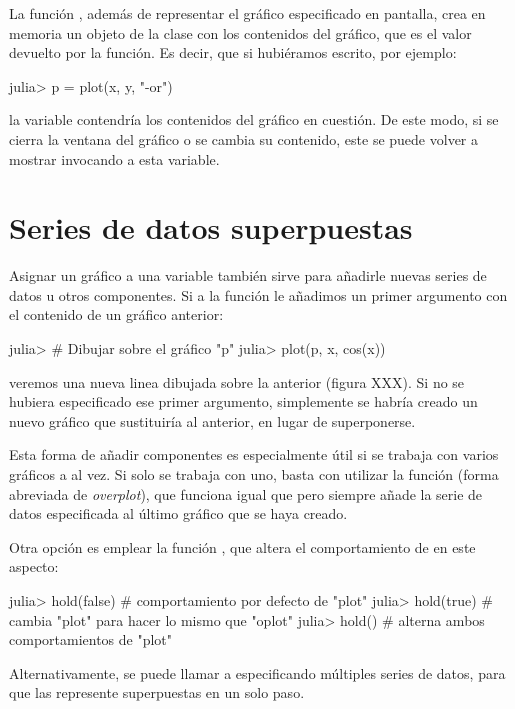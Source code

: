 La función , además de representar el gráfico especificado en pantalla, crea en memoria un objeto de la clase  con los contenidos del gráfico, que es el valor devuelto por la función. Es decir, que si hubiéramos escrito, por ejemplo:

\begin{jlconcode}
julia> p = plot(x, y, "-or")
\end{jlconcode}

la variable  contendría los contenidos del gráfico en cuestión. De este modo, si se cierra la ventana del gráfico o se cambia su contenido, este se puede volver a mostrar invocando a esta variable.

\section{Series de datos superpuestas}

Asignar un gráfico a una variable también sirve para añadirle nuevas series de datos u otros componentes. Si a la función  le añadimos un primer argumento con el contenido de un gráfico anterior:

\begin{jlconcode}
julia> # Dibujar sobre el gráfico "p"
julia> plot(p, x, cos(x))
\end{jlconcode}

veremos una nueva linea dibujada sobre la anterior (figura XXX). Si no se hubiera especificado ese primer argumento, simplemente se habría creado un nuevo gráfico que sustituiría al anterior, en lugar de superponerse.

Esta forma de añadir componentes es especialmente útil si se trabaja con varios gráficos a al vez. Si solo se trabaja con uno, basta con utilizar la función  (forma abreviada de \emph{overplot}), que funciona igual que  pero siempre añade la serie de datos especificada al último gráfico que se haya creado.

Otra opción es emplear la función , que altera el comportamiento de  en este aspecto:

\begin{jlconcode}
julia> hold(false) # comportamiento por defecto de "plot"
julia> hold(true)  # cambia "plot" para hacer lo mismo que "oplot"
julia> hold()      # alterna ambos comportamientos de "plot"
\end{jlconcode}

Alternativamente, se puede llamar a  especificando múltiples series de datos, para que las represente superpuestas en un solo paso.

